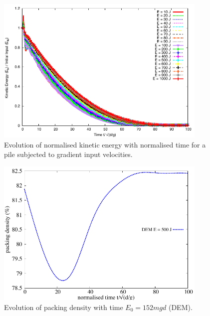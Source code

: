 \documentclass[3p,times,procedia,number]{elsarticle}
\begin{document}
\begin{figure}[tbhp]
  \centering
  \includegraphics[width=0.9\textwidth]{figs/Normalised_Energy_Time_Slope_DEM}
  \caption{Evolution of normalised kinetic energy with normalised time for a pile 
  subjected to gradient input velocities.}
  \label{fig:Normalised_Energy_Time_Slope_DEM}
\end{figure}

\begin{figure}[tbhp]
  \centering
  \includegraphics[width=0.9\textwidth]{figs/voro_500}
  \caption{Evolution of packing density with time $E_0 = 152 mgd$ (DEM).}
  \label{fig:voro_500}
\end{figure}
\end{document}
